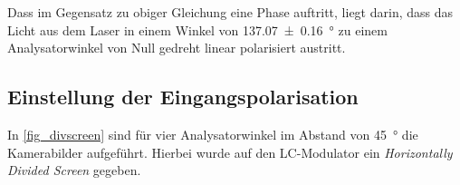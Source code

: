 \documentclass[
	a4paper,
	12pt,
	pagesize,
	ngerman
]{scrartcl}
\begin{document}
			Dass im Gegensatz zu obiger Gleichung eine Phase auftritt, liegt darin, dass das Licht aus dem Laser in einem Winkel von \SI{137,07\pm 0.16}{\degree} zu einem Analysatorwinkel von Null gedreht linear polarisiert austritt.



		\subsection{Einstellung der Eingangspolarisation}
		In \cref{fig_divscreen} sind für vier Analysatorwinkel im Abstand von \SI{45}{\degree} die Kamerabilder aufgeführt.
		Hierbei wurde auf den LC-Modulator ein \textit{Horizontally Divided Screen} gegeben.
\end{document}
